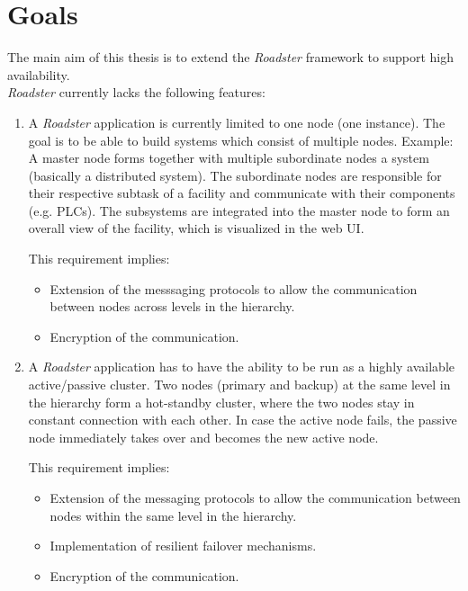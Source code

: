 \documentclass[a4paper]{article}
\begin{document}
\section{Goals}
The main aim of this thesis is to extend the \emph{Roadster} framework to
support high availability.\\

\emph{Roadster} currently lacks the following features:

\begin{enumerate}
	\item A \emph{Roadster} application is currently limited to one node
		(one instance). The goal is to be able to build systems which
		consist of multiple nodes. Example: A master node forms
		together with multiple subordinate nodes a system (basically a
		distributed system). The subordinate nodes are responsible for
		their respective subtask of a facility and communicate with
		their components (e.g. PLCs). The subsystems are integrated into
		the master node to form an overall view of the facility, which
		is visualized in the web UI.

This requirement implies:

\begin{itemize}
	\item Extension of the messsaging protocols to allow the communication
		between nodes across levels in the hierarchy.

	\item Encryption of the communication.
\end{itemize}

\item A \emph{Roadster} application has to have the ability to be run as a
	highly available active/passive cluster. Two nodes (primary and backup)
	at the same level in the hierarchy form a hot-standby cluster, where
	the two nodes stay in constant connection with each other. In case the
	active node fails, the passive node immediately takes over and becomes
	the new active node.

This requirement implies:

\begin{itemize}
	\item Extension of the messaging protocols to allow the communication
		between nodes within the same level in the hierarchy.

	\item Implementation of resilient failover mechanisms.

	\item Encryption of the communication.
\end{itemize}



\end{enumerate}
\end{document}
